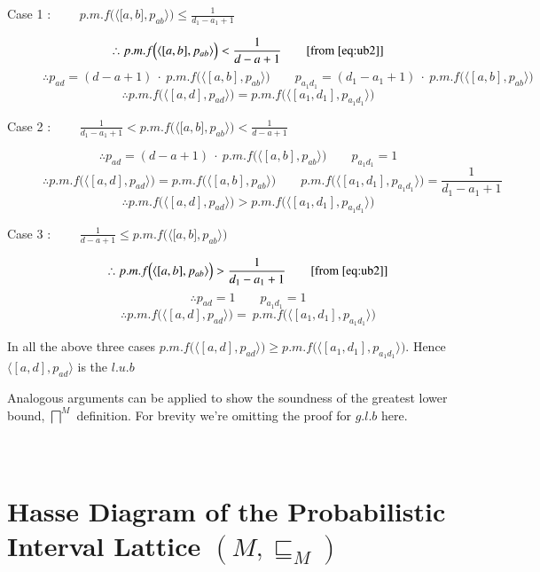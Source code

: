 \documentclass[final,3p, review, times]{Elsevier/elsarticle}
\begin{document}
\begin{description}
	\item[Case 1 : $\qquad\displaystyle p.m.f\Big(\langle\lbrack a,b\rbrack,p_{ab}\rangle\Big)\leq\frac{1}{d_1-a_1+1}$] \hfill
	$$\therefore \displaystyle p.m.f\Big(\langle[a,b],p_{ab}\rangle\Big)<\frac{1}{d-a+1}\qquad[\mathrm{from}\ \ref{eq:ub2}]$$
	$$\therefore p_{ad}=(d-a+1)\ \cdot\ p.m.f\Big(\langle[a,b],p_{ab}\rangle\Big)\qquad p_{a_1d_1}=(d_1-a_1+1)\ \cdot\ p.m.f\Big(\langle[a,b],p_{ab}\rangle\Big)$$
	$$\therefore p.m.f\Big(\langle[a,d],p_{ad}\rangle\Big)=p.m.f\Big(\langle[a_1,d_1],p_{a_1d_1}\rangle\Big)$$
	\item[Case 2 : $\qquad\displaystyle \frac{1}{d_1-a_1+1}<p.m.f\Big(\langle\lbrack a,b\rbrack,p_{ab}\rangle\Big)<\frac{1}{d-a+1}$] \hfill
	$$\therefore p_{ad}=(d-a+1)\ \cdot\ p.m.f\Big(\langle[a,b],p_{ab}\rangle\Big)\qquad p_{a_1d_1}=1$$
	$$\therefore p.m.f\Big(\langle[a,d],p_{ad}\rangle\Big)=p.m.f\Big(\langle[a,b],p_{ab}\rangle\Big)\qquad p.m.f\Big(\langle[a_1,d_1],p_{a_1d_1}\rangle\Big)=\frac{1}{d_1-a_1+1}$$
	$$\therefore p.m.f\Big(\langle[a,d],p_{ad}\rangle\Big)>p.m.f\Big(\langle[a_1,d_1],p_{a_1d_1}\rangle\Big)$$
	\item[Case 3 : $\qquad\displaystyle \frac{1}{d-a+1}\leq p.m.f\Big(\langle\lbrack a,b\rbrack,p_{ab}\rangle\Big)$] \hfill
	$$\therefore \displaystyle p.m.f\Big(\langle[a,b],p_{ab}\rangle\Big)>\frac{1}{d_1-a_1+1}\qquad[\mathrm{from}\ \ref{eq:ub2}]$$
	$$\therefore p_{ad}=1\qquad p_{a_1d_1}=1$$
	$$\therefore p.m.f\Big(\langle[a,d],p_{ad}\rangle\Big)=\ p.m.f\Big(\langle[a_1,d_1],p_{a_1d_1}\rangle\Big)$$
\end{description}

In all the above three cases $p.m.f\Big(\langle[a,d],p_{ad}\rangle\Big)\geq p.m.f\Big(\langle[a_1,d_1],p_{a_1d_1}\rangle\Big)$. Hence $\langle[a,d],p_{ad}\rangle$ is the $l.u.b$

Analogous arguments can be applied to show the soundness of the greatest lower bound, $\displaystyle\bigsqcap^M$ definition. For brevity we're omitting the proof for $g.l.b$ here.









\newpage
\section{\\Hasse Diagram of the Probabilistic Interval Lattice $(M,\sqsubseteq_M)$}
\label{app:interval_hasse}
\end{document}
